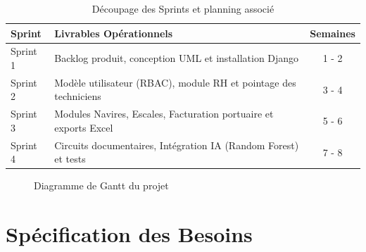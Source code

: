 \documentclass[12pt,a4paper,oneside]{report}
\begin{document}
\begin{table}[H]
\centering
\begin{tabular}{llc}
\toprule
\textbf{Sprint} & \textbf{Livrables Opérationnels} & \textbf{Semaines} \\
\midrule
Sprint 1 & Backlog produit, conception UML et installation Django & 1 - 2 \\
Sprint 2 & Modèle utilisateur (RBAC), module RH et pointage des techniciens & 3 - 4 \\
Sprint 3 & Modules Navires, Escales, Facturation portuaire et exports Excel & 5 - 6 \\
Sprint 4 & Circuits documentaires, Intégration IA (Random Forest) et tests & 7 - 8 \\
\bottomrule
\end{tabular}
\caption{Découpage des Sprints et planning associé}
\label{tab:scrum_planning}
\end{table}

\begin{figure}[H]
    \centering
    \color{gray}
    \caption{Diagramme de Gantt du projet}
    \label{fig:gantt}
\end{figure}

\chapter{Spécification des Besoins}
\end{document}
